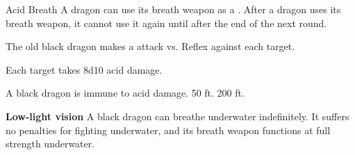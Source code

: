     \begin{freeability}{Acid Breath}
      A dragon can use its breath weapon as a .
      After a dragon uses its breath weapon, it cannot use it again until after the end of the next round.
      \par The old black dragon makes a  attack
        vs. Reflex against each target.
    
    \hit Each target takes 8d10 acid damage.
    \end{freeability}
  
      
       A black dragon is immune to acid damage.
     50 ft.
     200 ft.
    \par\noindent\textbf{Low-light vision}
        A black dragon can breathe underwater indefinitely.
        It suffers no penalties for fighting underwater, and its breath weapon functions at full strength underwater.
  


